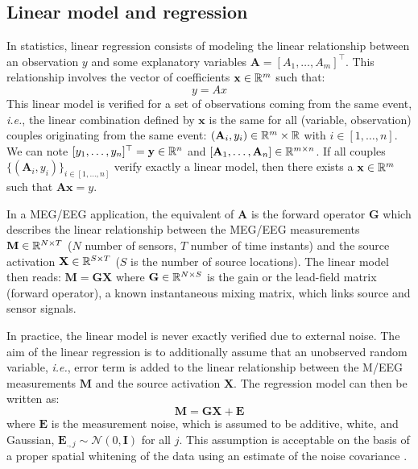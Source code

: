 \subsection{Linear model and regression}
In statistics, linear regression consists of modeling the linear relationship between an observation $y$ and some explanatory variables $\mathbf{A}=[A_1,\dots ,A_m]^\top$. This relationship involves the vector of coefficients $\mathbf{x}\in\mathbb{R}^m$ such that:
\begin{equation} \label{eq_linreg}
	y = Ax	
\end{equation}
This linear model is verified for a set of observations coming from the same event, \textit{i.e.}, the linear combination defined by $\mathbf{x}$ is the same for all (variable, observation) couples originating from the same event: $(\mathbf{A}_i, y_i)\in\mathbb{R}^m\times\mathbb{R}$ with $i\in [1,\dots ,n]$. We can note $[y_1, \dots ,y_n]^\top=\mathbf{y}\in\mathbb{R}^n$ and $[\mathbf{A}_1,\dots ,\mathbf{A}_n]\in\mathbb{R}^{m\times n}$. If all couples $\{(\mathbf{A}_i,y_i)\}_{i\in [1,\dots ,n]}$ verify exactly a linear model, then there exists a $\mathbf{x}\in\mathbb{R}^m$ such that $\mathbf{Ax}=y$.

In a MEG/EEG application, the equivalent of $\mathbf{A}$ is the forward operator $\mathbf{G}$ which describes the linear relationship between the MEG/EEG measurements $\mathbf{M}\in\mathbb{R}^{N\times T}$ ($N$ number of sensors, $T$ number of time instants) and the source activation $\mathbf{X}\in\mathbb{R}^{S\times T}$ ($S$ is the number of source locations). The linear model then reads: $\mathbf{M} = \mathbf{GX}$ where $\mathbf{G}\in\mathbb{R}^{N\times S}$ is the gain or the lead-field matrix (forward operator), a known instantaneous mixing matrix, which links source and sensor signals. 

In practice, the linear model is never exactly verified due to external noise. The aim of the linear regression is to additionally assume that an unobserved random variable, \textit{i.e.}, error term is added to the linear relationship between the M/EEG measurements $\mathbf{M}$ and the source activation $\mathbf{X}$. The regression model can then be written as:
\begin{equation} \label{eq_linmeeg}
	\mathbf{M} = \mathbf{GX} + \mathbf{E}
\end{equation}
where $\mathbf{E}$ is the measurement noise, which is assumed to be additive, white, and Gaussian, \mbox{$\mathbf{E}_{.,j}\sim\mathcal{N}(0,\mathbf{I})$} for all $j$. This assumption is acceptable on the basis of a proper spatial whitening of the data using an estimate of the noise covariance \cite{engemann2015automated}.

